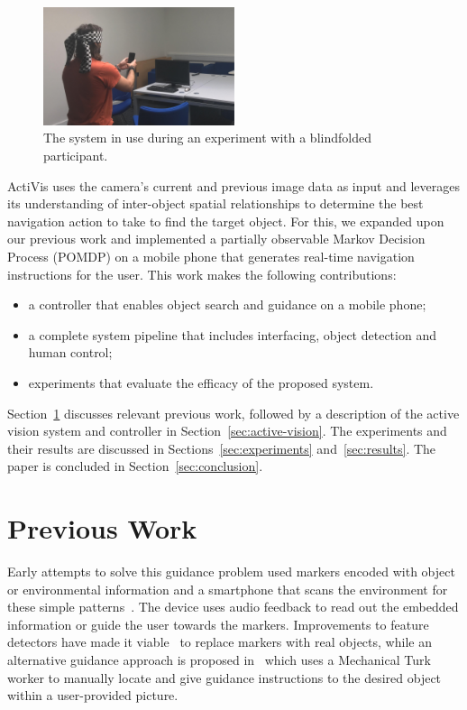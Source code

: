 \documentclass[runningheads]{llncs}
\begin{document}
\begin{figure}
  \centering
  \includegraphics[width=0.5\textwidth]{figures/system_use.png}
  \caption{The system in use during an experiment with a blindfolded participant. }\label{fig:system-in-use}
\end{figure}

ActiVis uses the camera's current and previous image data as input and leverages its understanding of inter-object spatial relationships to determine the best navigation action to take to find the target object.
For this, we expanded upon our previous work and implemented a partially observable Markov Decision Process (POMDP) on a mobile phone that generates real-time navigation instructions for the user.
This work makes the following contributions:

\begin{itemize}
  \item a controller that enables object search and guidance on a mobile phone;
  \item a complete system pipeline that includes interfacing, object detection and human control;
  \item experiments that evaluate the efficacy of the proposed system.
\end{itemize}

Section~\ref{sec:previous-work} discusses relevant previous work, followed by a description of the active vision system and controller in Section~\ref{sec:active-vision}.
The experiments and their results are discussed in Sections~\ref{sec:experiments} and~\ref{sec:results}.
The paper is concluded in Section~\ref{sec:conclusion}.

\section{Previous Work}\label{sec:previous-work}

Early attempts to solve this guidance problem used markers encoded with object or environmental information and a smartphone that scans the environment for these simple patterns~\cite{gude2013blind,manduchi2012mobile}. 
The device uses audio feedback to read out the embedded information or guide the user towards the markers. 
Improvements to feature detectors have made it viable~\cite{redmon2016you} to replace markers with real objects, while an alternative guidance approach is proposed in~\cite{bigham2010vizwiz} which uses a Mechanical Turk worker to manually locate and give guidance instructions to the desired object within a user-provided picture. 
\end{document}
